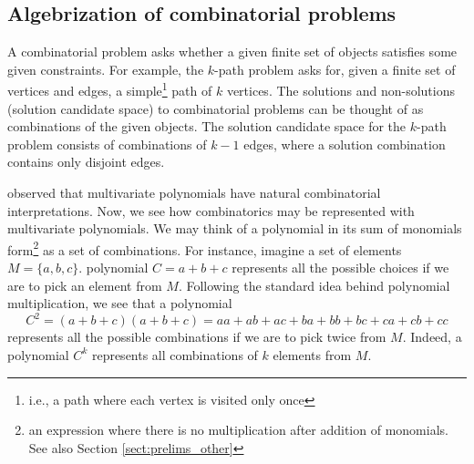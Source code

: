 \subsection{Algebrization of combinatorial problems}
\label{sect:algebrization}

A combinatorial problem asks whether a given 
finite set of objects satisfies some given constraints. 
For example, the $k$-path problem asks for, given a finite set of vertices and edges, 
a simple\footnote{i.e., a path where each vertex is visited only once} path of $k$ vertices. 
The solutions and non-solutions (solution candidate space) 
to combinatorial problems can be thought of as 
combinations of the given objects. 
The solution candidate space for the $k$-path problem 
consists of combinations of $k-1$ edges, where 
a  solution combination contains only disjoint edges.
%


\citeauthor{Valiant92} \cite{Valiant92} observed that 
multivariate polynomials have natural combinatorial interpretations. 
Now, we see how combinatorics may be represented with multivariate polynomials. 
We may think of a polynomial in its sum of monomials 
form\footnote{an expression where there is no multiplication 
after addition of monomials. See also Section \ref{sect:prelims_other}} 
as a set of combinations. For instance, imagine a set of elements $M = \{a, b, c\}$. 
 polynomial $C = a+b+c$ represents all the possible choices 
if we are to pick an element from $M$. Following the standard idea behind polynomial 
multiplication, we see that a polynomial 
\[
  C^2 = (a+b+c)(a+b+c) = aa + ab + ac + ba + bb + bc + ca + cb + cc
\]
represents 
all the possible combinations if we are to pick twice from $M$. 
Indeed, a polynomial $C^k$ represents all combinations of $k$ elements from $M$.

